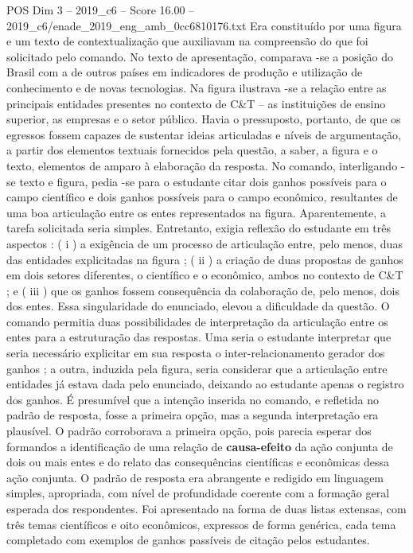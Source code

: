 \begin{textsample}{POS Dim 3 – 2019\_c6 – Score 16.00 – 2019\_c6/enade\_2019\_eng\_amb\_0cc6810176.txt}
Era constituído por uma figura e um texto de contextualização que auxiliavam na compreensão do que foi solicitado pelo comando.
No texto de apresentação, comparava -se a posição do Brasil com a de outros países em indicadores de produção e utilização de conhecimento e de novas tecnologias.
Na figura ilustrava -se a relação entre as principais entidades presentes no contexto de C\&T – as instituições de ensino superior, as empresas e o setor público.
Havia o pressuposto, portanto, de que os egressos fossem capazes de sustentar ideias articuladas e níveis de argumentação, a partir dos elementos textuais fornecidos pela questão, a saber, a figura e o texto, elementos de amparo à elaboração da resposta.
No comando, interligando -se texto e figura, pedia -se para o estudante citar dois ganhos possíveis para o campo científico e dois ganhos possíveis para o campo econômico, resultantes de uma boa articulação entre os entes representados na figura.
Aparentemente, a tarefa solicitada seria simples.
Entretanto, exigia reflexão do estudante em três aspectos : ( i ) a exigência de um processo de articulação entre, pelo menos, duas das entidades explicitadas na figura ; ( ii ) a criação de duas propostas de ganhos em dois setores diferentes, o científico e o econômico, ambos no contexto de C\&T ; e ( iii ) que os ganhos fossem consequência da colaboração de, pelo menos, dois dos entes.
Essa singularidade do enunciado, elevou a dificuldade da questão.
O comando permitia duas possibilidades de interpretação da articulação entre os entes para a estruturação das respostas.
Uma seria o estudante interpretar que seria necessário explicitar em sua resposta o inter-relacionamento gerador dos ganhos ; a outra, induzida pela figura, seria considerar que a articulação entre entidades já estava dada pelo enunciado, deixando ao estudante apenas o registro dos ganhos.
É presumível que a intenção inserida no comando, e refletida no padrão de resposta, fosse a primeira opção, mas a segunda interpretação era plausível.
O padrão corroborava a primeira opção, pois parecia esperar dos formandos a identificação de uma relação de \textbf{causa-efeito} da ação conjunta de dois ou mais entes e do relato das consequências científicas e econômicas dessa ação conjunta.
O padrão de resposta era abrangente e redigido em linguagem simples, apropriada, com nível de profundidade coerente com a formação geral esperada dos respondentes.
Foi apresentado na forma de duas listas extensas, com três temas científicos e oito econômicos, expressos de forma genérica, cada tema completado com exemplos de ganhos passíveis de citação pelos estudantes.

\end{textsample}
